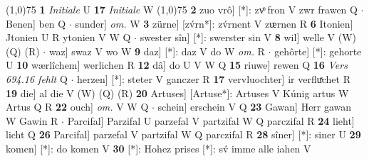 \documentclass[8pt,a4paper,notitlepage]{article}
\begin{document}
\begin{table}[ht]
\begin{minipage}[t]{0.5\linewidth}
\line(1,0){75} \newline
\textbf{1} \textit{Initiale} U  \textbf{17} \textit{Initiale} W  \newline
\line(1,0){75} \newline
\textbf{2} zuo vrô] [*]: zvͦ fron V zwr frawen Q  $\cdot$ Benen] ben Q  $\cdot$ sunder] \textit{om.} W \textbf{3} zürne] [zv́rn*]: zv́rnent V zᵫrnen R \textbf{6} Itonien] Jtonien U R ytonien V W Q  $\cdot$ swester sîn] [*]: swerster sin V \textbf{8} wil] welle V (W) (Q) (R)  $\cdot$ waz] swaz V wo W \textbf{9} daz] [*]: daz V do W \textit{om.} R  $\cdot$ gehôrte] [*]: gehorte U \textbf{10} wærlîchem] werlichen R \textbf{12} dâ] do U V W Q \textbf{15} riuwe] rewen Q \textbf{16} \textit{Vers 694.16 fehlt} Q   $\cdot$ herzen] [*]: steter V ganczer R \textbf{17} vervluochter] ir verfluͯchet R \textbf{19} die] al die V (W) (Q) (R) \textbf{20} Artuses] [Artuse*]: Artuses V Kúnig artus W Artus Q R \textbf{22} ouch] \textit{om.} V W Q  $\cdot$ schein] erschein V Q \textbf{23} Gawan] Herr gawan W Gawin R  $\cdot$ Parcifal] Parzifal U parzefal V partzifal W Q parczifal R \textbf{24} lieht] licht Q \textbf{26} Parcifal] parzefal V partzifal W Q parczifal R \textbf{28} sîner] [*]: siner U \textbf{29} komen] [*]: do komen V \textbf{30} [*]: Hohez prises [*]: sv́ imme alle iahen V \newline
\end{minipage}
\end{table}
\end{document}
